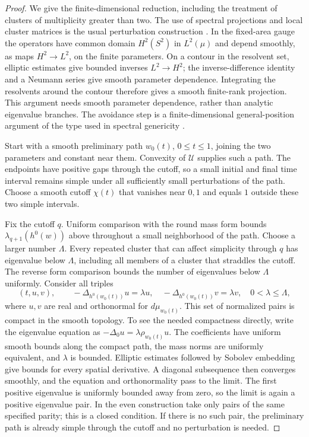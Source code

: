 \begin{proof}
We give the finite-dimensional reduction, including the treatment of
clusters of multiplicity greater than two.  The use of spectral
projections and local cluster matrices is the usual perturbation
construction \cite[III, \S6.4, Theorem~6.17; IV, \S3.4,
Theorem~3.16]{Kato}. In the fixed-area gauge the operators have common
domain $H^2(S^2)$ in $L^2(\mu)$ and depend smoothly, as maps
$H^2\to L^2$, on the finite parameters. On a contour in the resolvent
set, elliptic estimates give bounded inverses $L^2\to H^2$;
the inverse-difference identity and a Neumann series give smooth
parameter dependence. Integrating the resolvents around the contour
therefore gives a smooth finite-rank projection. This argument needs
smooth parameter dependence, rather than analytic eigenvalue branches.
The avoidance step is a finite-dimensional
general-position argument of the type used in spectral genericity
\cite{Uhlenbeck}.

Start with a smooth preliminary path \(w_0(t)\), \(0\leq t\leq1\),
joining the two parameters and constant near them.  Convexity of
\(\mathcal U\) supplies such a path.  The endpoints have positive gaps
through the cutoff, so a small initial and final time interval remains
simple under all sufficiently small perturbations of the path.  Choose
a smooth cutoff \(\chi(t)\) that vanishes near \(0,1\) and equals \(1\)
outside these two simple intervals.

Fix the cutoff \(q\).  Uniform comparison with the round mass form
bounds \(\lambda_{q+1}(h^0(w))\) above throughout a small neighborhood
of the path.  Choose a larger number \(\Lambda\).  Every repeated
cluster that can affect simplicity through \(q\) has eigenvalue below
\(\Lambda\), including all members of a cluster that straddles the
cutoff.  The reverse form comparison bounds the number of eigenvalues
below \(\Lambda\) uniformly.  Consider all triples
\[
 (t,u,v),\qquad
 -\Delta_{h^0(w_0(t))}u=\lambda u,\quad
 -\Delta_{h^0(w_0(t))}v=\lambda v,\quad 0<\lambda\leq\Lambda,
\]
where \(u,v\) are real and orthonormal for \(d\mu_{w_0(t)}\).
This set of normalized pairs is compact in the smooth topology.
To see the needed compactness directly, write the eigenvalue equation
as \(-\Delta_0u=\lambda\rho_{w_0(t)}u\).  The coefficients have uniform
smooth bounds along the compact path, the mass norms are uniformly
equivalent, and \(\lambda\) is bounded.  Elliptic estimates followed by
Sobolev embedding give bounds for every spatial derivative.  A diagonal
subsequence then converges smoothly, and the equation and
orthonormality pass to the limit.  The first positive eigenvalue is
uniformly bounded away from zero, so the limit is again a positive
eigenvalue pair.  In the even construction take only pairs of the same
specified parity; this is a closed condition.
If there is no such pair, the preliminary path is already simple through
the cutoff and no perturbation is needed.


\end{proof}
